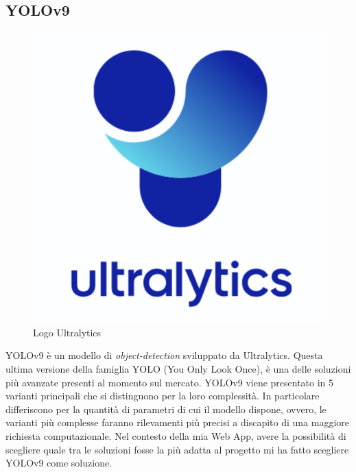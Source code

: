 \subsection{YOLOv9 }
\begin{figure}
\centering
\vspace{-5px}
\includegraphics[scale=0.4]{img/Yolo.png}
\caption{Logo Ultralytics}
\end{figure}

YOLOv9 è un modello di \textit{object-detection} sviluppato da Ultralytics. Questa ultima versione della famiglia YOLO (You Only Look Once), è una delle soluzioni più avanzate presenti al momento sul mercato. YOLOv9 viene presentato in 5 varianti principali che si distinguono per la loro complessità. In particolare differiscono per la quantità di parametri di cui il modello dispone, ovvero, le varianti più complesse faranno rilevamenti più precisi a discapito di una maggiore richiesta computazionale. Nel contesto della mia Web App, avere la possibilità di scegliere quale tra le soluzioni fosse la più adatta al progetto mi ha fatto scegliere YOLOv9 come soluzione.

